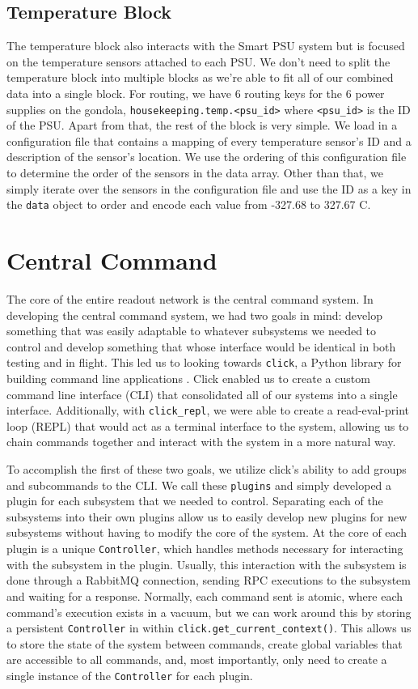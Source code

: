 \subsection{Temperature Block}
The temperature block also interacts with the Smart PSU system but is focused on the temperature sensors attached to each PSU.
We don't need to split the temperature block into multiple blocks as we're able to fit all of our combined data into a single block.
For routing, we have 6 routing keys for the 6 power supplies on the gondola, \texttt{housekeeping.temp.<psu\_id>} where \texttt{<psu\_id>} is the ID of the PSU.
Apart from that, the rest of the block is very simple. 
We load in a configuration file that contains a mapping of every temperature sensor's ID and a description of the sensor's location. 
We use the ordering of this configuration file to determine the order of the sensors in the data array.
Other than that, we simply iterate over the sensors in the configuration file and use the ID as a key in the \texttt{data} object to order and encode each value from -327.68 to 327.67 C.

\section{Central Command}
The core of the entire readout network is the central command system.
In developing the central command system, we had two goals in mind: develop something that was easily adaptable to whatever subsystems we needed to control and develop something that whose interface would be identical in both testing and in flight.
This led us to looking towards \texttt{click}, a Python library for building command line applications \parencite{click}.
Click enabled us to create a custom command line interface (CLI) that consolidated all of our systems into a single interface.
Additionally, with \texttt{click\_repl}, we were able to create a read-eval-print loop (REPL) that would act as a terminal interface to the system, allowing us to chain commands together and interact with the system in a more natural way.

To accomplish the first of these two goals, we utilize click's ability to add groups and subcommands to the CLI.
We call these \texttt{plugins} and simply developed a plugin for each subsystem that we needed to control. 
Separating each of the subsystems into their own plugins allow us to easily develop new plugins for new subsystems without having to modify the core of the system.
At the core of each plugin is a unique \texttt{Controller}, which handles methods necessary for interacting with the subsystem in the plugin.
Usually, this interaction with the subsystem is done through a RabbitMQ connection, sending RPC executions to the subsystem and waiting for a response.
Normally, each command sent is atomic, where each command's execution exists in a vacuum, but we can work around this by storing a persistent \texttt{Controller} in within \texttt{click.get\_current\_context()}. 
This allows us to store the state of the system between commands, create global variables that are accessible to all commands, and, most importantly, only need to create a single instance of the \texttt{Controller} for each plugin.

